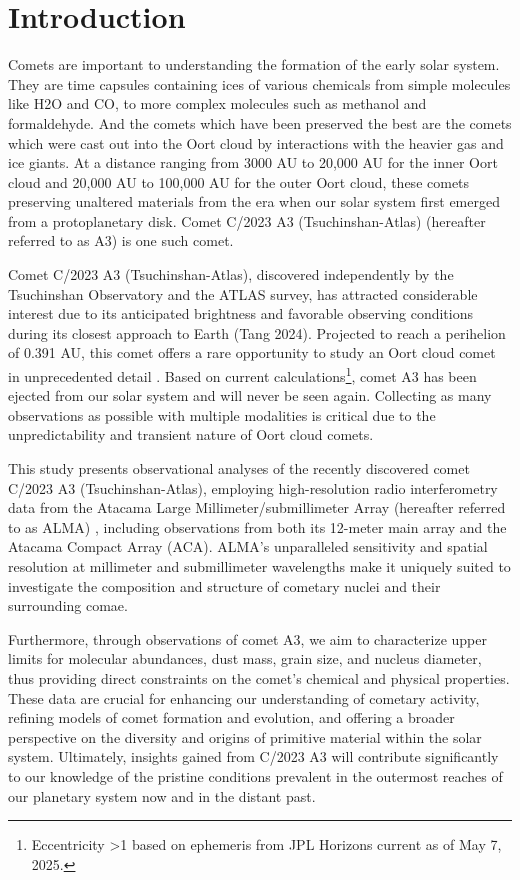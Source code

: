\section{Introduction} \label{intro}

Comets are important to understanding the formation of the early solar system. They are time capsules containing ices of various chemicals from simple molecules like H2O and CO, to more complex molecules such as methanol and formaldehyde. And the comets which have been preserved the best are the comets which were cast out into the Oort cloud by interactions with the heavier gas and ice giants. At a distance ranging from 3000 AU to 20,000 AU for the inner Oort cloud and 20,000 AU to 100,000 AU for the outer Oort cloud, these comets preserving unaltered materials from the era when our solar system first emerged from a protoplanetary disk. Comet C/2023 A3 (Tsuchinshan-Atlas) (hereafter referred to as A3) is one such comet.

Comet C/2023 A3 (Tsuchinshan-Atlas), discovered independently by the Tsuchinshan Observatory and the ATLAS survey, has attracted considerable interest due to its anticipated brightness and favorable observing conditions during its closest approach to Earth (Tang 2024). Projected to reach a perihelion of 0.391 AU, this comet offers a rare opportunity to study an Oort cloud comet in unprecedented detail \citep{Tang2024}. Based on current calculations\footnote{Eccentricity \textgreater{1} based on ephemeris from JPL Horizons current as of May 7, 2025.}, comet A3 has been ejected from our solar system and will never be seen again. Collecting as many observations as possible with multiple modalities is critical due to the unpredictability and transient nature of Oort cloud comets.

This study presents observational analyses of the recently discovered comet C/2023 A3 (Tsuchinshan-Atlas), employing high-resolution radio
interferometry data from the Atacama Large Millimeter/submillimeter Array (hereafter referred to as ALMA) \citep{ALMA}, including observations from both its 12-meter main array
and the Atacama Compact Array (ACA). ALMA's unparalleled sensitivity and spatial resolution at millimeter and submillimeter wavelengths make it uniquely suited to investigate the composition and structure of cometary nuclei and their surrounding comae.

Furthermore, through observations of comet A3, we aim to characterize upper limits for molecular abundances, dust mass, grain size, and nucleus diameter, thus providing direct constraints on the comet's chemical and physical properties. These data are crucial for enhancing our understanding of cometary activity, refining models of comet formation and evolution, and offering a broader perspective on the diversity and origins of primitive material within the solar system. Ultimately, insights gained from C/2023 A3 will contribute significantly to our knowledge of the pristine conditions prevalent in the outermost reaches of our planetary system now and in the distant past.
